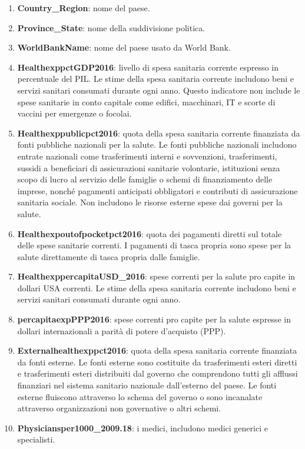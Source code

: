 \documentclass{report}
\begin{document}
\begin{enumerate}
    \item \textbf{Country\_Region}: nome del paese.
    \item \textbf{Province\_State}: nome della suddivisione politica.
    \item \textbf{WorldBankName}: nome del paese usato da World Bank.
    \item \textbf{HealthexppctGDP2016}: livello di spesa sanitaria corrente espresso in percentuale del PIL. Le stime della spesa sanitaria corrente includono beni e servizi sanitari consumati durante ogni anno. Questo indicatore non include le spese sanitarie in conto capitale come edifici, macchinari, IT e scorte di vaccini per emergenze o focolai.
    \item \textbf{Healthexppublicpct2016}: quota della spesa sanitaria corrente finanziata da fonti pubbliche nazionali per la salute. Le fonti pubbliche nazionali includono entrate nazionali come trasferimenti interni e sovvenzioni, trasferimenti, sussidi a beneficiari di assicurazioni sanitarie volontarie, istituzioni senza scopo di lucro al servizio delle famiglie o schemi di finanziamento delle imprese, nonché pagamenti anticipati obbligatori e contributi di assicurazione sanitaria sociale. Non includono le risorse esterne spese dai governi per la salute.
    \item \textbf{Healthexpoutofpocketpct2016}: quota dei pagamenti diretti sul totale delle spese sanitarie correnti. I pagamenti di tasca propria sono spese per la salute direttamente di tasca propria dalle famiglie.
    \item \textbf{HealthexppercapitaUSD\_2016}: spese correnti per la salute pro capite in dollari USA correnti. Le stime della spesa sanitaria corrente includono beni e servizi sanitari consumati durante ogni anno.
    \item \textbf{percapitaexpPPP2016}: spese correnti pro capite per la salute espresse in dollari internazionali a parità di potere d'acquisto (PPP).
    \item \textbf{Externalhealthexppct2016}: quota della spesa sanitaria corrente finanziata da fonti esterne. Le fonti esterne sono costituite da trasferimenti esteri diretti e trasferimenti esteri distribuiti dal governo che comprendono tutti gli afflussi finanziari nel sistema sanitario nazionale dall'esterno del paese. Le fonti esterne fluiscono attraverso lo schema del governo o sono incanalate attraverso organizzazioni non governative o altri schemi.
    \item \textbf{Physiciansper1000\_2009.18}: i medici, includono medici generici e specialisti.

\end{enumerate}
\end{document}
